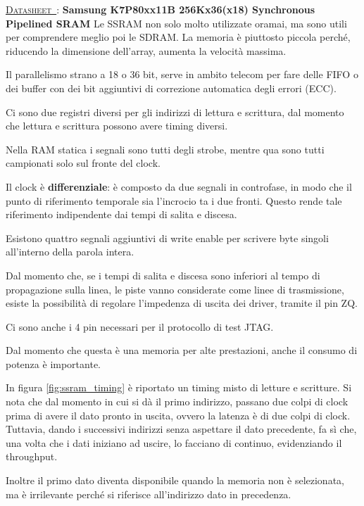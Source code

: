 \documentclass[11pt,4paper]{report}
\newcounter{datasheetcnt}
\renewcommand{\thedatasheetcnt}{\arabic{datasheetcnt}}
\newenvironment{datasheet}[2]{\refstepcounter{datasheetcnt}\par\bigskip\medskip \label{#2}
	\noindent \underline{\textsc{Datasheet~\thedatasheetcnt}}: \textbf{#1} \newline}{\medskip}
\begin{document}
\begin{datasheet}{Samsung K7P80xx11B 256Kx36(x18) Synchronous Pipelined SRAM}{}
Le SSRAM non solo molto utilizzate oramai, ma sono utili per comprendere meglio poi le SDRAM. La memoria è piuttosto piccola perché, riducendo la dimensione dell'array, aumenta la velocità massima. 

Il parallelismo strano a 18 o 36 bit, serve in ambito telecom per fare delle FIFO o dei buffer con dei bit aggiuntivi di correzione automatica degli errori (ECC).

Ci sono due registri diversi per gli indirizzi di lettura e scrittura, dal momento che lettura e scrittura possono avere timing diversi. 

Nella RAM statica i segnali sono tutti degli strobe, mentre qua sono tutti campionati solo sul fronte del clock.

Il clock è \textbf{differenziale}: è composto da due segnali in controfase, in modo che il punto di riferimento temporale sia l'incrocio ta i due fronti. Questo rende tale riferimento indipendente dai tempi di salita e discesa.

Esistono quattro segnali aggiuntivi di write enable per scrivere byte singoli all'interno della parola intera.

Dal momento che, se i tempi di salita e discesa sono inferiori al tempo di propagazione sulla linea, le piste vanno considerate come linee di trasmissione, esiste la possibilità di regolare l'impedenza di uscita dei driver, tramite il pin ZQ.

Ci sono anche i 4 pin necessari per il protocollo di test JTAG.

Dal momento che questa è una memoria per alte prestazioni, anche il consumo di potenza è importante.

In figura \ref{fig:ssram_timing} è riportato un timing misto di letture e scritture. Si nota che dal momento in cui si dà il primo indirizzo, passano due colpi di clock prima di avere il dato pronto in uscita, ovvero la latenza è di due colpi di clock. Tuttavia, dando i successivi indirizzi senza aspettare il dato precedente, fa sì che, una volta che i dati iniziano ad uscire, lo facciano di continuo, evidenziando il throughput. 

Inoltre il primo dato diventa disponibile quando la memoria non è selezionata, ma è irrilevante perché si riferisce all'indirizzo dato in precedenza.


\end{datasheet}
\end{document}
